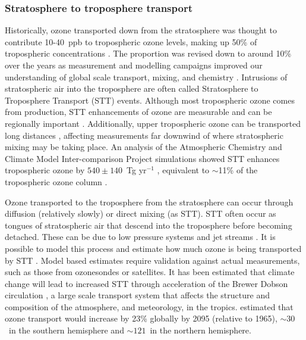   \subsubsection{Stratosphere to troposphere transport}
    \label{LR:O3:STT}
    Historically, ozone transported down from the stratosphere was thought to contribute 10-40~ppb to tropospheric ozone levels, making up 50\% of tropospheric concentrations \parencite{Atkinson2000, Stohl2003}.
    The proportion was revised down to around 10\% over the years as measurement and modelling campaigns improved our understanding of global scale transport, mixing, and chemistry \parencite{Guenther2006, Monks2015}.
    Intrusions of stratospheric air into the troposphere are often called Stratosphere to Troposphere Transport (STT) events.
    Although most tropospheric ozone comes from production, STT enhancements of 
    ozone are measurable and can be regionally important 
    \parencite[eg.,][]{Jacobson2000, Lelieveld2009, Kuang2017}.
    Additionally, upper tropospheric ozone can be transported long distances 
    \parencite{Cooper2004}, affecting measurements far downwind of where 
    stratospheric mixing may be taking place.
    An analysis of the Atmospheric Chemistry and Climate Model Inter-comparison Project simulations showed STT enhances tropospheric ozone by $540\pm140$~Tg yr$^{-1}$ \parencite{Young2013}, equivalent to $\sim$11\% of the tropospheric ozone column \parencite{Monks2015}.
    
    
    Ozone transported to the troposphere from the stratosphere can occur through diffusion (relatively slowly) or direct mixing (as STT).
    STT often occur as tongues of stratospheric air that descend into the troposphere before becoming detached.
    These can be due to low pressure systems and jet streams \parencite{Sprenger2003}.
    It is possible to model this process and estimate how much ozone is being 
    transported by STT \parencite[e.g.,][]{Young2013, Ojha2016}.
    Model based estimates require validation against actual measurements, such as those from ozonesondes or satellites.
    It has been estimated that climate change will lead to increased STT 
    through acceleration of the Brewer Dobson circulation 
    \parencite{Hegglin2009}, a large scale transport system that affects the 
    structure and composition of the atmosphere, and meteorology, in the 
    tropics.
    \textcite{Hegglin2009} estimated that ozone transport would increase by 
    23\% globally by 2095 (relative to 1965), $\sim 30$\tgpyr ~in the southern 
    hemisphere and $\sim 121$\tgpyr ~in the northern hemisphere.
    
